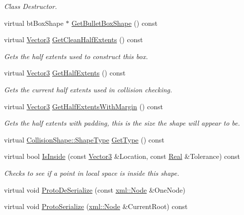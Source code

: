 \begin{DoxyCompactItemize}
\begin{DoxyCompactList}\small\item\em Class Destructor. \item\end{DoxyCompactList}\item 
virtual btBoxShape $\ast$ \hyperlink{classMezzanine_1_1BoxCollisionShape_a408a3b15bf4425d827c7cf4ee908efef}{GetBulletBoxShape} () const 
\item 
virtual \hyperlink{classMezzanine_1_1Vector3}{Vector3} \hyperlink{classMezzanine_1_1BoxCollisionShape_a5214ce314dc7d383ae81995e618f87cb}{GetCleanHalfExtents} () const 
\begin{DoxyCompactList}\small\item\em Gets the half extents used to construct this box. \item\end{DoxyCompactList}\item 
virtual \hyperlink{classMezzanine_1_1Vector3}{Vector3} \hyperlink{classMezzanine_1_1BoxCollisionShape_a4e1193a0cfed37f268ae1730de7b8d08}{GetHalfExtents} () const 
\begin{DoxyCompactList}\small\item\em Gets the current half extents used in collision checking. \item\end{DoxyCompactList}\item 
virtual \hyperlink{classMezzanine_1_1Vector3}{Vector3} \hyperlink{classMezzanine_1_1BoxCollisionShape_a198887a16d922effe302695ff69bcd88}{GetHalfExtentsWithMargin} () const 
\begin{DoxyCompactList}\small\item\em Gets the half extents with padding, this is the size the shape will appear to be. \item\end{DoxyCompactList}\item 
virtual \hyperlink{classMezzanine_1_1CollisionShape_ad04186055565998879b64176d6dd100d}{CollisionShape::ShapeType} \hyperlink{classMezzanine_1_1BoxCollisionShape_ae2b4af7afa6cc37c51b062589048e26d}{GetType} () const 
\item 
virtual bool \hyperlink{classMezzanine_1_1BoxCollisionShape_a1902aa75d5c18ad4ce090952b6af0050}{IsInside} (const \hyperlink{classMezzanine_1_1Vector3}{Vector3} \&Location, const \hyperlink{namespaceMezzanine_a726731b1a7df72bf3583e4a97282c6f6}{Real} \&Tolerance) const 
\begin{DoxyCompactList}\small\item\em Checks to see if a point in local space is inside this shape. \item\end{DoxyCompactList}\item 
virtual void \hyperlink{classMezzanine_1_1BoxCollisionShape_aeff89859ae98a391bf1232e190c839b5}{ProtoDeSerialize} (const \hyperlink{classMezzanine_1_1xml_1_1Node}{xml::Node} \&OneNode)
\item 
virtual void \hyperlink{classMezzanine_1_1BoxCollisionShape_abdd854fc0f165b3b17baecb0bb3961b4}{ProtoSerialize} (\hyperlink{classMezzanine_1_1xml_1_1Node}{xml::Node} \&CurrentRoot) const 
\end{DoxyCompactItemize}
